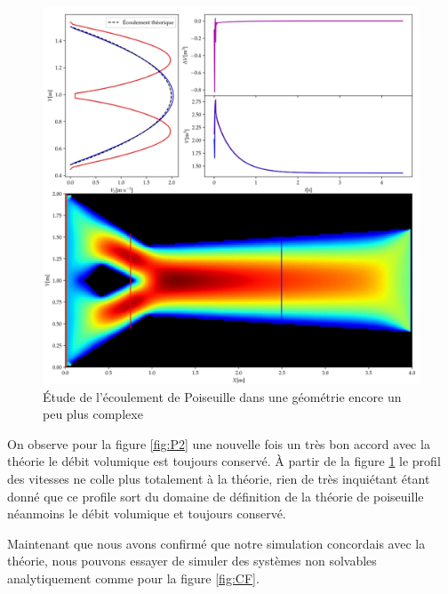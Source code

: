 \begin{figure}[hbtp]
  \centering
  \includegraphics[width=\linewidth]{Fig/Poiseuille3.png}
  \caption{Étude de l'écoulement de Poiseuille dans une géométrie encore un peu plus complexe}
  \label{fig:P3}
\end{figure}

On observe pour la figure \ref{fig:P2} une nouvelle fois un très bon accord avec la théorie le débit volumique est toujours conservé. À partir de la figure \ref{fig:P3} le profil des vitesses ne colle plus totalement à la théorie, rien de très inquiétant étant donné que ce profile sort du domaine de définition de la théorie de poiseuille néanmoins le débit volumique et toujours conservé. 

Maintenant que nous avons confirmé que notre simulation concordais avec la théorie, nous pouvons essayer de simuler des 
systèmes non solvables analytiquement comme pour la figure \ref{fig:CF}. 

